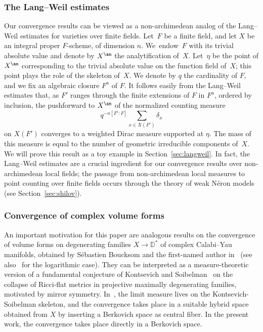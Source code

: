\subsubsection*{The Lang--Weil estimates}
Our convergence results can be viewed as a non-archimedean analog of the Lang--Weil estimates
for varieties over finite fields. Let~$F$ be a finite field, and let $X$ be an integral proper $F$-scheme, of dimension $n$. We~endow~$F$ with its trivial absolute value and denote by $X^{\an}$ the analytification of~$X$. Let~$\eta$ be the point of $X^{\an}$ corresponding to the trivial absolute value on the function field of~$X$; this point plays the role of the skeleton of~$X$.
We denote by $q$ the cardinality of $F$, and we fix an algebraic closure $F^a$ of $F$. It follows easily from the Lang--Weil estimates that, as $F'$ ranges through the finite extensions of $F$ in $F^a$, ordered by inclusion, the pushforward to $X^{\an}$ of the normalized counting measure
\[
q^{-n[F'\colon F]}\sum_{x\in X(F')}\delta_x
\]
on $X(F')$ converges to a weighted Dirac measure supported at $\eta$. The mass of this measure
is equal to the number of geometric irreducible components of~$X$. We will prove this result as a toy example in Section~\ref{sec:langweil}. In fact, the Lang--Weil estimates are a crucial ingredient for our convergence results over non-archimedean local fields; the passage from non-archimedean local measures to point counting over finite fields occurs through the theory of weak Néron models (see Section~\ref{sec:shilov}).

\subsubsection*{Convergence of complex volume forms}
An important motivation for this paper are analogous results on the convergence of volume forms on degenerating families $X\to\mathbb{D}^*$ of complex Calabi--Yau manifolds, obtained by Sébastien Boucksom and the first-named author in~\cite{BJ} (see also~\cite{Sh19} for the logarithmic case). They can be interpreted as a measure-theoretic version of a fundamental conjecture of Kontsevich and Soibelman~\cite{KS} on the collapse of Ricci-flat metrics in projective maximally degenerating families, motivated by mirror symmetry. In~\cite{BJ}, the limit measure lives on the Kontsevich-Soibelman skeleton, and the convergence takes place in a suitable hybrid space obtained from $X$ by inserting a Berkovich space as central fiber.
In the present work, the convergence takes place directly in a Berkovich space.


